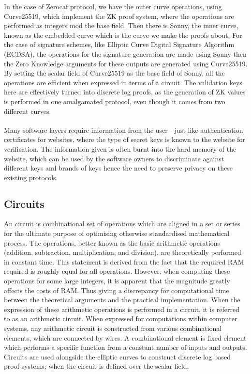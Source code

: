 \documentclass{article}
\theoremstyle{definition}
\theoremstyle{remark}
\begin{document}
	In the case of Zerocaf protocol, we have the outer curve operations, using Curve25519, which implement the ZK proof system, where the operations are performed as integers mod the base field. Then there is Sonny, the inner curve, known as the embedded curve which is the curve we make the proofs about. For the case of signature schemes, like Elliptic Curve Digital Signature Algorithm (ECDSA), the operations for the signature generation are made using Sonny then the Zero Knowledge  arguments for these outputs are generated using Curve25519. By setting the scalar field of Curve25519 as the base field of Sonny, all the operations are efficient when expressed in terms of a circuit. The validation keys here are effectively turned into discrete log proofs, as the generation of ZK values is performed in one amalgamated protocol, even though it comes from two different curves. \\\\
	
	Many software layers require information from the user - just like authentication certificates for websites, where the type of secret keys is known to the website for verification. The information given is often burnt into the hard memory of the website, which can be used by the software owners to discriminate against different keys and brands of keys hence the need to preserve privacy on these existing protocols.
	
	\subsection{Circuits}
	
	An circuit is combinational set of operations which are aligned in a set or series for the ultimate purpose of optimising otherwise standardised mathematical process. The operations, better known as the basic arithmetic operations (addition, subtraction, multiplication, and division), are theoretically performed in constant time. This statement is derived from the fact that the required RAM required is roughly equal for all operations. However, when computing these operations for some large integers, it is apparent that the magnitude greatly affects the costs of RAM. Thus giving a discrepancy for computational time between the theoretical arguments and the practical implementation. When the expression of these arithmetic operations is performed in a circuit, it is referred to as an arithmetic circuit. When expressed for computations within computer systems, any arithmetic circuit is constructed from various combinational elements, which are connected by wires. A combinational element is fixed element which performs a specific function from a constant number of inputs and outputs. Circuits are used alongside the elliptic curves to construct discrete log based proof systems; when the circuit is defined over the scalar field. 
	
\end{document}
